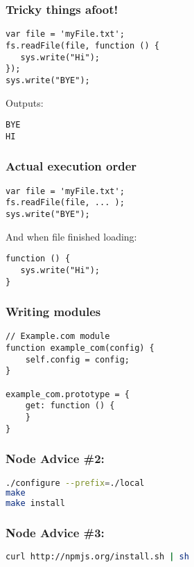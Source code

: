 \documentclass{beamer}
\begin{document}
\begin{frame}[fragile]
\frametitle{Tricky things afoot!}
\begin{lstlisting}
var file = 'myFile.txt';
fs.readFile(file, function () {
   sys.write("Hi");
});
sys.write("BYE");
\end{lstlisting}
\pause
Outputs:

\begin{lstlisting}
BYE
HI
\end{lstlisting}

\end{frame}

\begin{frame}[fragile]
\frametitle{Actual execution order}
\begin{lstlisting}
var file = 'myFile.txt';
fs.readFile(file, ... );
sys.write("BYE");
\end{lstlisting}

\pause
And when file finished loading:

\begin{lstlisting}
function () {
   sys.write("Hi");
}
\end{lstlisting}
\end{frame}

\begin{frame}[fragile]
\frametitle{Writing modules}
\begin{lstlisting}
// Example.com module
function example_com(config) {
	self.config = config;
}

example_com.prototype = {
	get: function () {
	}
}
\end{lstlisting}
\end{frame}




\begin{frame}[fragile]
\frametitle{Node Advice \#2:}
\begin{lstlisting}[language=sh]
./configure --prefix=./local
make
make install
\end{lstlisting}
\end{frame}

\begin{frame}[fragile]
\frametitle{Node Advice \#3:}
\begin{lstlisting}[language=sh]
curl http://npmjs.org/install.sh | sh
\end{lstlisting}
\end{frame}
\end{document}
